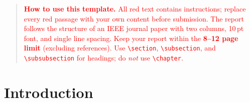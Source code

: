 \documentclass[journal, 10pt, twoside]{IEEEtran}
\begin{document}
\begin{quote}
  \textcolor{red}{\textbf{How to use this template.}
  All red text contains instructions; replace every red passage with your own content before submission.  The report follows the structure of an IEEE journal paper with two columns, 10\,pt font, and single line spacing.  Keep your report within the \textbf{8--12 page limit} (excluding references).  Use \texttt{\textbackslash section}, \texttt{\textbackslash subsection}, and  \texttt{\textbackslash subsubsection} for headings; do \emph{not} use \texttt{\textbackslash chapter}.} 
\end{quote}

\section{Introduction}
\label{sec:introduction}
\end{document}
